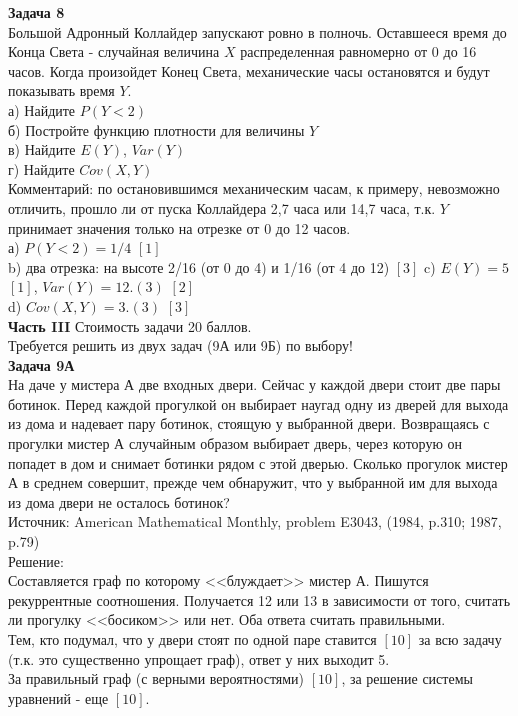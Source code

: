 \documentclass[pdftex,12pt,a4paper]{article}
\begin{document}
\textbf{Задача 8} \\
Большой Адронный Коллайдер запускают ровно в полночь. Оставшееся время до Конца Света - случайная величина $X$ распределенная равномерно от 0 до 16 часов. Когда произойдет Конец Света, механические часы остановятся и будут показывать время $Y$. \\
а) Найдите $P(Y<2)$ \\
б) Постройте функцию плотности для величины $Y$ \\
в) Найдите $E(Y)$, $Var(Y)$\\
г) Найдите $Cov(X,Y)$ \\
Комментарий: по остановившимся механическим часам, к примеру, невозможно отличить, прошло ли от пуска Коллайдера 2,7 часа или 14,7 часа, т.к. $Y$ принимает значения только на отрезке от 0 до 12 часов. \\
а) $P(Y<2)=1/4$ $[1]$ \\
b) два отрезка: на высоте 2/16 (от 0 до 4) и 1/16 (от 4 до 12) $[3]$
c) $E(Y)=5$ $[1]$, $Var(Y)=12.(3)$ $[2]$ \\
d) $Cov(X,Y)=3.(3)$ $[3]$ \\


\textbf{Часть III} Стоимость задачи 20 баллов. \\

Требуется решить \textbf{} из двух задач (9А или 9Б) по
выбору! \\

\textbf{Задача 9А} \\
На даче у мистера А две входных двери. Сейчас у каждой двери стоит две пары ботинок. Перед каждой прогулкой он выбирает наугад одну из дверей для выхода из дома и надевает пару ботинок, стоящую у выбранной двери. Возвращаясь с прогулки мистер А случайным образом выбирает дверь, через которую он попадет в дом и снимает ботинки рядом с этой дверью. Сколько прогулок мистер А в среднем совершит, прежде чем обнаружит, что у выбранной им для выхода из дома двери не осталось ботинок? \\
Источник: American Mathematical Monthly, problem E3043, (1984, p.310; 1987, p.79)\\
Решение: \\
Составляется граф по которому <<блуждает>> мистер А. Пишутся рекуррентные соотношения.
Получается 12 или 13 в зависимости от того, считать ли прогулку <<босиком>> или нет.
Оба ответа считать правильными.\\
Тем, кто подумал, что у двери стоят по одной паре ставится $[10]$ за всю задачу (т.к. это существенно упрощает граф), ответ у них выходит 5. \\
За правильный граф (с верными вероятностями) $[10]$, за решение системы уравнений - еще $[10]$. \\
\end{document}
